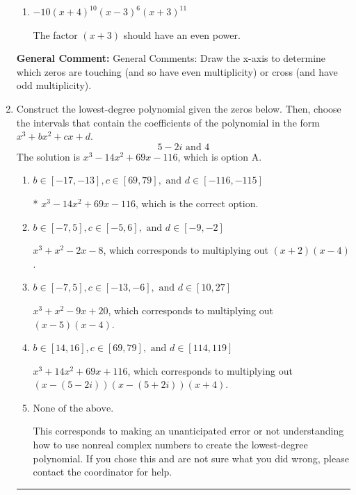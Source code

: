 \documentclass{extbook}[14pt]
\newcommand{\litem}[1]{\item #1

\rule{\textwidth}{0.4pt}}
\begin{document}
\begin{enumerate}
{\begin{enumerate}[label=\Alph*.]
The factors $(x - 3)$ and $(x + 3)$ should both have even powers.
\item \( -10(x + 4)^{10} (x - 3)^{6} (x + 3)^{11} \)

The factor $(x + 3)$ should have an even power.
\end{enumerate}

\textbf{General Comment:} General Comments: Draw the x-axis to determine which zeros are touching (and so have even multiplicity) or cross (and have odd multiplicity).
}
\litem{
Construct the lowest-degree polynomial given the zeros below. Then, choose the intervals that contain the coefficients of the polynomial in the form $x^3+bx^2+cx+d$.
\[ 5 - 2 i \text{ and } 4 \]The solution is \( x^{3} -14 x^{2} +69 x -116 \), which is option A.\begin{enumerate}[label=\Alph*.]
\item \( b \in [-17, -13], c \in [69, 79], \text{ and } d \in [-116, -115] \)

* $x^{3} -14 x^{2} +69 x -116$, which is the correct option.
\item \( b \in [-7, 5], c \in [-5, 6], \text{ and } d \in [-9, -2] \)

$x^{3} + x^{2} -2 x -8$, which corresponds to multiplying out $(x + 2)(x -4)$.
\item \( b \in [-7, 5], c \in [-13, -6], \text{ and } d \in [10, 27] \)

$x^{3} + x^{2} -9 x + 20$, which corresponds to multiplying out $(x -5)(x -4)$.
\item \( b \in [14, 16], c \in [69, 79], \text{ and } d \in [114, 119] \)

$x^{3} +14 x^{2} +69 x + 116$, which corresponds to multiplying out $(x-(5 - 2 i))(x-(5 + 2 i))(x + 4)$.
\item \( \text{None of the above.} \)

This corresponds to making an unanticipated error or not understanding how to use nonreal complex numbers to create the lowest-degree polynomial. If you chose this and are not sure what you did wrong, please contact the coordinator for help.
\end{enumerate}

}
\end{enumerate}
\end{document}

